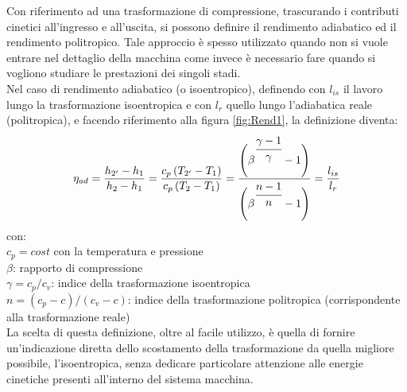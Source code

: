 Con riferimento ad una trasformazione di compressione, trascurando i contributi cinetici all'ingresso e all'uscita, si possono definire il rendimento adiabatico ed il rendimento politropico. Tale approccio è spesso utilizzato quando non si vuole entrare nel dettaglio della macchina come invece è necessario fare quando si vogliono studiare le prestazioni dei singoli stadi.\\
Nel caso di rendimento adiabatico (o isoentropico), definendo con $l_{is}$ il lavoro lungo la trasformazione isoentropica e con $l_r$ quello lungo l'adiabatica reale (politropica), e facendo riferimento alla figura \ref{fig:Rend1}, la definizione diventa:
\begin{align*}
\eta_{ad} = \frac{h_{2'} - h_1}{h_2 - h_1} = \frac{c_p \left( T_{2'} - T_1 \right)}{c_p \left( T_2 - T_1 \right)} =
 \frac{\Bigg( \beta^{\cfrac{\gamma -1}{\gamma}} -1 \Bigg)}{\Bigg( \beta^{\cfrac{n -1}{n}} -1 \Bigg)} = \frac{l_{is}}{l_r}
\end{align*}
con:\\[1mm]
$c_p = cost$ con la temperatura e pressione\\
$\beta$: rapporto di compressione\\
$\gamma=c_p/c_v$: indice della trasformazione isoentropica\\
$n=(c_p-c)/(c_v-c)$: indice della trasformazione politropica (corrispondente alla trasformazione reale)\\[2mm]
La scelta di questa definizione, oltre al facile utilizzo, è quella di fornire un'indicazione diretta dello scostamento della trasformazione da quella migliore possibile, l'isoentropica, senza dedicare particolare attenzione alle energie cinetiche presenti all'interno del sistema macchina.

